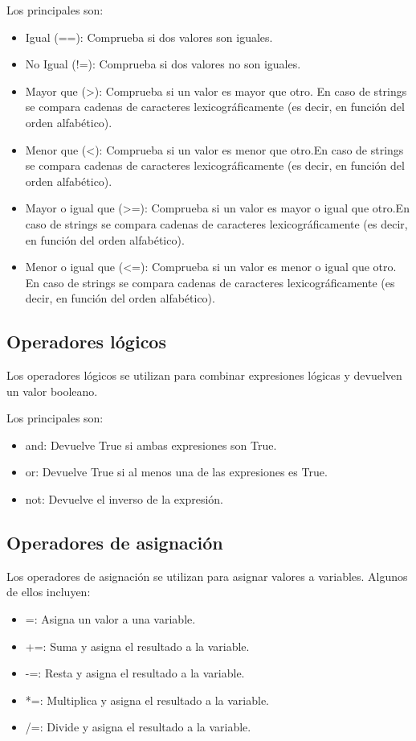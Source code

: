 Los principales son:
\begin{itemize}
    \item Igual (==): Comprueba si dos valores son iguales.
    \item No Igual (!=): Comprueba si dos valores no son iguales.
    \item Mayor que (>): Comprueba si un valor es mayor que otro. En caso de strings se compara cadenas de caracteres lexicográficamente (es decir, en función del orden alfabético).
    \item Menor que (<): Comprueba si un valor es menor que otro.En caso de strings se compara cadenas de caracteres lexicográficamente (es decir, en función del orden alfabético).
    \item Mayor o igual que (>=): Comprueba si un valor es mayor o igual que otro.En caso de strings se compara cadenas de caracteres lexicográficamente (es decir, en función del orden alfabético).
    \item Menor o igual que (<=): Comprueba si un valor es menor o igual que otro. En caso de strings se compara cadenas de caracteres lexicográficamente (es decir, en función del orden alfabético).
\end{itemize}

\subsection{Operadores lógicos}
Los operadores lógicos se utilizan para combinar expresiones lógicas y devuelven un valor booleano. 

Los principales son:
\begin{itemize}
    \item and: Devuelve True si ambas expresiones son True.
    \item or: Devuelve True si al menos una de las expresiones es True.
    \item not: Devuelve el inverso de la expresión.
\end{itemize}

\subsection{Operadores de asignación}
Los operadores de asignación se utilizan para asignar valores a variables. Algunos de ellos incluyen:
\begin{itemize}
    \item =: Asigna un valor a una variable.
    \item +=: Suma y asigna el resultado a la variable.
    \item -=: Resta y asigna el resultado a la variable.
    \item *=: Multiplica y asigna el resultado a la variable.
    \item /=: Divide y asigna el resultado a la variable.
\end{itemize}


